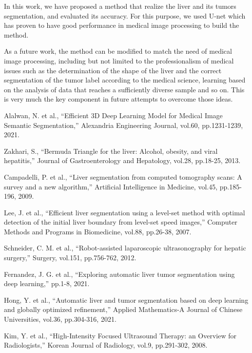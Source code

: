 \documentclass[a4paper]{article}
\begin{document}
In this work, we have proposed a method that realize the liver and its tumors segmentation, and evaluated its accuracy. For this purpose, we used U-net which has proven to have good performance in medical image processing to build the method.

As a future work, the method can be modified to match the need of medical image processing, including but not limited to the professionalism of medical issues such as the determination of the shape of the liver and the correct segmentation of the tumor label according to the medical science, learning based on the analysis of data that reaches a sufficiently diverse sample and so on. This is very much the key component in future attempts to overcome those ideas.


\footnotesize
\begin{thebibliography}{99}

    Alalwan, N. et al., “Efficient 3D Deep Learning Model for Medical Image Semantic Segmentation,” Alexandria Engineering Journal, vol.60, pp.1231-1239, 2021.
    
    Zakhari, S., “Bermuda Triangle for the liver: Alcohol, obesity, and viral hepatitis,” Journal of Gastroenterology and Hepatology, vol.28, pp.18-25,  2013.
    
    Campadelli, P. et al., “Liver segmentation from computed tomography scans: A survey and a new algorithm,” Artificial Intelligence in Medicine, vol.45, pp.185-196, 2009.
    
    Lee, J. et al., “Efficient liver segmentation using a level-set method with optimal detection of the initial liver boundary from level-set speed images,” Computer Methods and Programs in Biomedicine, vol.88, pp.26-38, 2007.
    
    Schneider, C. M. et al., “Robot-assisted laparoscopic ultrasonography for hepatic surgery,” Surgery, vol.151, pp.756-762, 2012.
    
    Fernandez, J. G. et al., “Exploring automatic liver tumor segmentation using deep learning,” pp.1-8, 2021.
    
    Hong, Y. et al., “Automatic liver and tumor segmentation based on deep learning and globally optimized refinement,” Applied Mathematics-A Journal of Chinese Universities, vol.36, pp.304-316, 2021.
    
    Kim, Y. et al., “High-Intensity Focused Ultrasound Therapy: an Overview for Radiologists,” Korean Journal of Radiology, vol.9, pp.291-302, 2008.


\end{thebibliography}
\end{document}
